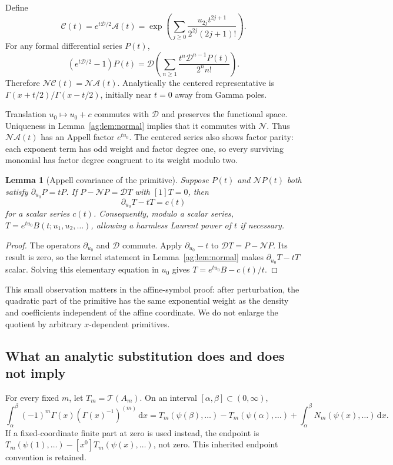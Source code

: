 \documentclass[11pt,letterpaper]{article}
\numberwithin{equation}{section}
\newtheorem{lemma}[theorem]{Lemma}
\theoremstyle{definition}\newtheorem{definition}[theorem]{Definition}
\theoremstyle{remark}\newtheorem{remark}[theorem]{Remark}
\newcommand{\D}{\mathcal D}\newcommand{\NF}{\mathcal N}\newcommand{\Prim}{\mathcal T}
\newcommand{\A}{\mathcal A}\newcommand{\HH}{\mathcal H}\newcommand{\BB}{\mathcal B}
\newcommand{\dd}{\,\mathrm d}\newcommand{\ii}{\mathrm i}
\begin{document}
Define
\begin{equation}\label{ag:eq:centered}
 \mathcal C(t)=e^{t\D/2}\A(t)
 =\exp\left(\sum_{j\ge0}
       \frac{u_{2j}t^{2j+1}}{2^{2j}(2j+1)!}\right).
\end{equation}
For any formal differential series $P(t)$,
\[
 (e^{t\D/2}-1)P(t)
 =\D\left(\sum_{n\ge1}\frac{t^n\D^{n-1}P(t)}{2^n n!}\right).
\]
Therefore $\NF\mathcal C(t)=\NF\A(t)$. Analytically the centered
representative is $\Gamma(x+t/2)/\Gamma(x-t/2)$, initially near $t=0$
away from Gamma poles.

Translation $u_0\mapsto u_0+c$ commutes with $\D$ and preserves the
functional space. Uniqueness in Lemma~\ref{ag:lem:normal} implies that
it commutes with $\NF$. Thus $\NF\A(t)$ has an Appell factor $e^{tu_0}$.
The centered series also shows factor parity: each exponent term has
odd weight and factor degree one, so every surviving monomial has
factor degree congruent to its weight modulo two.

\begin{lemma}[Appell covariance of the primitive]\label{ag:lem:appell-primitive}
Suppose $P(t)$ and $\NF P(t)$ both satisfy
$\partial_{u_0}P=tP$. If $P-\NF P=\D T$ with $[1]T=0$, then
\[
 \partial_{u_0}T-tT=c(t)
\]
for a scalar series $c(t)$. Consequently, modulo a scalar series,
$T=e^{tu_0}B(t;u_1,u_2,\ldots)$, allowing a harmless Laurent power
of $t$ if necessary.
\end{lemma}
\begin{proof}
The operators $\partial_{u_0}$ and $\D$ commute. Apply
$\partial_{u_0}-t$ to $\D T=P-\NF P$. Its result is zero, so the
kernel statement in Lemma~\ref{ag:lem:normal} makes
$\partial_{u_0}T-tT$ scalar. Solving this elementary equation in $u_0$
gives $T=e^{tu_0}B-c(t)/t$.
\end{proof}
This small observation matters in the affine-symbol proof: after
perturbation, the quadratic part of the primitive has the same
exponential weight as the density and coefficients independent of the
affine coordinate. We do not enlarge the quotient by arbitrary
$x$-dependent primitives.

\subsection{What an analytic substitution does and does not imply}
For every fixed $m$, let $T_m=\Prim(A_m)$. On an interval
$[\alpha,\beta]\subset(0,\infty)$,
\begin{equation}\label{ag:eq:ordinary-gamma-integral}
 \int_\alpha^\beta(-1)^m\Gamma(x)(\Gamma(x)^{-1})^{(m)}\dd x
 =T_m(\psi(\beta),\ldots)-T_m(\psi(\alpha),\ldots)
       +\int_\alpha^\beta N_m(\psi(x),\ldots)\dd x.
\end{equation}
If a fixed-coordinate finite part at zero is used instead, the endpoint
is $T_m(\psi(1),\ldots)-[x^0]T_m(\psi(x),\ldots)$, not zero.
This inherited endpoint convention \cite{Manuscript} is retained.
\end{document}
